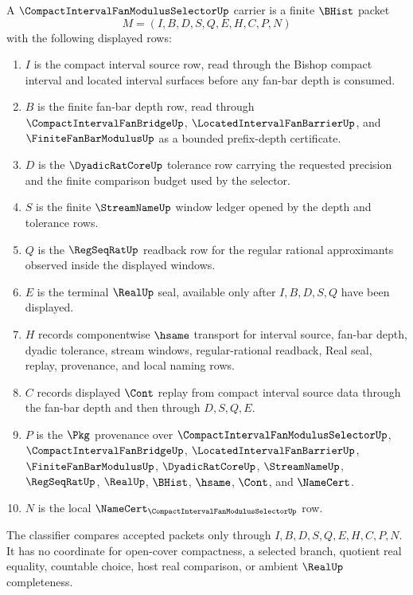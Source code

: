 \begin{definition}
\label{def:compact-interval-fan-modulus-selector-carrier}
A $\CompactIntervalFanModulusSelectorUp$ carrier is a finite $\BHist$ packet
$$
M=(I,B,D,S,Q,E,H,C,P,N)
$$
with the following displayed rows:
\begin{enumerate}
\item $I$ is the compact interval source row, read through the Bishop compact interval and located interval surfaces before any fan-bar depth is consumed.
\item $B$ is the finite fan-bar depth row, read through $\CompactIntervalFanBridgeUp$, $\LocatedIntervalFanBarrierUp$, and $\FiniteFanBarModulusUp$ as a bounded prefix-depth certificate.
\item $D$ is the $\DyadicRatCoreUp$ tolerance row carrying the requested precision and the finite comparison budget used by the selector.
\item $S$ is the finite $\StreamNameUp$ window ledger opened by the depth and tolerance rows.
\item $Q$ is the $\RegSeqRatUp$ readback row for the regular rational approximants observed inside the displayed windows.
\item $E$ is the terminal $\RealUp$ seal, available only after $I,B,D,S,Q$ have been displayed.
\item $H$ records componentwise $\hsame$ transport for interval source, fan-bar depth, dyadic tolerance, stream windows, regular-rational readback, Real seal, replay, provenance, and local naming rows.
\item $C$ records displayed $\Cont$ replay from compact interval source data through the fan-bar depth and then through $D,S,Q,E$.
\item $P$ is the $\Pkg$ provenance over $\CompactIntervalFanModulusSelectorUp$, $\CompactIntervalFanBridgeUp$, $\LocatedIntervalFanBarrierUp$, $\FiniteFanBarModulusUp$, $\DyadicRatCoreUp$, $\StreamNameUp$, $\RegSeqRatUp$, $\RealUp$, $\BHist$, $\hsame$, $\Cont$, and $\NameCert$.
\item $N$ is the local $\NameCert_{\CompactIntervalFanModulusSelectorUp}$ row.
\end{enumerate}
The classifier compares accepted packets only through $I,B,D,S,Q,E,H,C,P,N$. It has no coordinate for open-cover compactness, a selected branch, quotient real equality, countable choice, host real comparison, or ambient $\RealUp$ completeness.
\end{definition}

